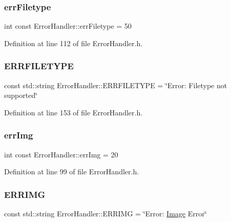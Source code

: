 \subsubsection{\texorpdfstring{errFiletype}{errFiletype}}
{\footnotesize\ttfamily int const Error\+Handler\+::err\+Filetype = 50\hspace{0.3cm}{\ttfamily [static]}}



Definition at line 112 of file Error\+Handler.\+h.

\mbox{\label{classErrorHandler_abc06f91cc00179b2993cb558770c4d80}} 
\subsubsection{\texorpdfstring{ERRFILETYPE}{ERRFILETYPE}}
{\footnotesize\ttfamily const std\+::string Error\+Handler\+::\+E\+R\+R\+F\+I\+L\+E\+T\+Y\+PE = \char`\"{}Error\+: Filetype not supported\char`\"{}\hspace{0.3cm}{\ttfamily [static]}}



Definition at line 153 of file Error\+Handler.\+h.

\mbox{\label{classErrorHandler_ad0d235ee5e68a371b7369ab80513d4ec}} 
\subsubsection{\texorpdfstring{errImg}{errImg}}
{\footnotesize\ttfamily int const Error\+Handler\+::err\+Img = 20\hspace{0.3cm}{\ttfamily [static]}}



Definition at line 99 of file Error\+Handler.\+h.

\mbox{\label{classErrorHandler_a0e6e270374c8c2d2bf1cf3525e2b185b}} 
\subsubsection{\texorpdfstring{ERRIMG}{ERRIMG}}
{\footnotesize\ttfamily const std\+::string Error\+Handler\+::\+E\+R\+R\+I\+MG = \char`\"{}Error\+: \mbox{\hyperlink{classImage}{Image}} Error\char`\"{}\hspace{0.3cm}{\ttfamily [static]}}




